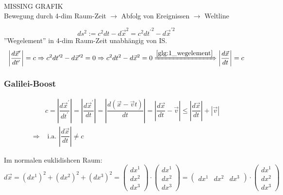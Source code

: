\documentclass[a4paper, 11pt]{article}
\numberwithin{equation}{section}
\begin{document}
MISSING GRAFIK\\
Bewegung durch 4-dim Raum-Zeit $\rightarrow$ Abfolg von Ereignissen $\rightarrow$ Weltline


\begin{equation}
\label{glg:1_wegelement}
ds^2 := c^2dt - d\vec{x}^2 = c^2d{t^\prime}^2 - d{\vec{x}^{\prime 2}}
\end{equation}
''Wegelement'' in 4-dim Raum-Zeit unabhängig von IS.
\begin{equation}
\left| \dfrac{d\vec{x}^\prime}{dt^\prime} \right| = c \Rightarrow c^2dt^{\prime 2}-d\vec{x}^{\prime 2} = 0 \Rightarrow c^2dt^2 - d\vec{x}^2 = 0 \xRightarrow{\ref{glg:1_wegelement}} \left|\dfrac{d\vec{x}}{dt} \right| = c
\end{equation}

\subsubsection*{Galilei-Boost}

\begin{equation}
\begin{aligned}
&c =\left| \dfrac{d\vec{x}^\prime}{dt^\prime}\right| = \left| \dfrac{d\vec{x}^\prime}{dt}\right| = \left| \dfrac{d(\vec{x}-\vec{v}t)}{dt}\right| = \left| \dfrac{d\vec{x}}{dt} - \vec{v}\right| \leq \left| \dfrac{d\vec{x}}{dt}\right| + \left| \vec{v} \right| \\
\Rightarrow &\text{ i.a. } \left| \dfrac{d\vec{x}}{dt}\right| \neq c
\end{aligned}
\end{equation}

Im normalen euklidishcen Raum:
\begin{equation}
d \vec{x} = (dx^1)^2 +(dx^2)^2 + (dx^3)^2 = \begin{pmatrix}
dx^1 \\ dx^2 \\ dx^3 \end{pmatrix} \cdot \begin{pmatrix}
dx^1 \\ dx^2 \\ dx^3 \end{pmatrix} = \begin{pmatrix}
dx^1 & dx^2 & dx^3 \end{pmatrix} \cdot \begin{pmatrix}
dx^1 \\ dx^2 \\dx^3\end{pmatrix}
\end{equation}
\end{document}
